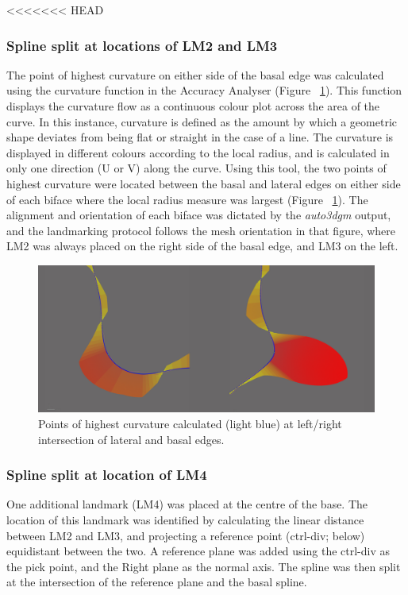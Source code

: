 \documentclass[review]{elsarticle}
\begin{document}
<<<<<<< HEAD
\subsubsection*{Spline split at locations of LM2 and LM3}

The point of highest curvature on either side of the basal edge was calculated using the curvature function in the Accuracy Analyser (Figure ~\ref{fig:fig-splinesplit}). This function displays the curvature flow as a continuous colour plot across the area of the curve. In this instance, curvature is defined as the amount by which a geometric shape deviates from being flat or straight in the case of a line. The curvature is displayed in different colours according to the local radius, and is calculated in only one direction (U or V) along the curve. Using this tool, the two points of highest curvature were located between the basal and lateral edges on either side of each biface where the local radius measure was largest (Figure ~\ref{fig:fig-splinesplit}). The alignment and orientation of each biface was dictated by the \textit{auto3dgm} output, and the landmarking protocol follows the mesh orientation in that figure, where LM2 was always placed on the right side of the basal edge, and LM3 on the left.

\begin{figure}[ht]\centering
\includegraphics[width=\linewidth]{analysis/images/splinesplit1.pdf}
\caption{Points of highest curvature calculated (light blue) at left/right intersection of lateral and basal edges.}
\label{fig:fig-splinesplit}
\end{figure}

\subsubsection*{Spline split at location of LM4}

One additional landmark (LM4) was placed at the centre of the base. The location of this landmark was identified by calculating the linear distance between LM2 and LM3, and projecting a reference point (ctrl-div; below) equidistant between the two. A reference plane was added using the ctrl-div as the pick point, and the Right plane as the normal axis. The spline was then split at the intersection of the reference plane and the basal spline.
\end{document}
